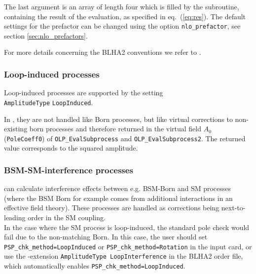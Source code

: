 The last argument is an array of length four which is filled by the subroutine, 
containing the result of the evaluation, as specified in eq.~(\ref{eq:res}).
The default settings for the prefactor can be changed using the option {\tt nlo\_prefactor}, 
see section \ref{sec:nlo_prefactors}.

For more details concerning the BLHA2 conventions we refer to \cite{Alioli:2013nda}.

\subsubsection{Loop-induced processes}

Loop-induced processes are supported by the setting \\
\texttt{AmplitudeType} \texttt{LoopInduced}.

In \gosam, they are not handled like Born processes, but like virtual corrections to non-existing born processes
and therefore returned in the virtual field $A_0$ (\texttt{PoleCoeff0}) of \texttt{OLP\_EvalSubprocess}
and \texttt{OLP\_EvalSubprocess2}. The returned value corresponds to
the  squared amplitude.


\subsubsection{BSM-SM-interference processes}
\gosam{} can calculate interference effects between e.g. BSM-Born and
SM processes
(where the BSM Born for example comes from additional interactions in an effective field theory).
These processes are handled as corrections being next-to-leading order
in the SM coupling. \\
In the case where the SM process is loop-induced, 
the standard  pole check would fail
due to the non-matching Born. In this case, the user should set \texttt{PSP\_chk\_method=LoopInduced}
or \texttt{PSP\_chk\_method=Rotation} in the \gosam{} input card,
or use the \gosam-extension \texttt{AmplitudeType LoopInterference} in the BLHA2 order file,
which automatically enables \texttt{PSP\_chk\_method=LoopInduced}.


